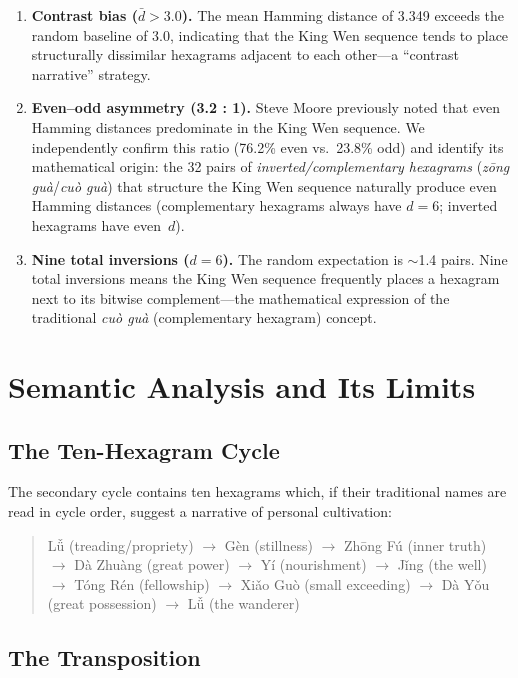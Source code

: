 \documentclass[11pt,a4paper]{article}
\begin{document}
\begin{enumerate}
  \item \textbf{Contrast bias ($\bar{d} > 3.0$).}
  The mean Hamming distance of 3.349 exceeds the random baseline of 3.0, indicating that the King Wen sequence tends to place structurally dissimilar hexagrams adjacent to each other---a ``contrast narrative'' strategy.

  \item \textbf{Even--odd asymmetry (3.2 : 1).}
  Steve Moore previously noted that even Hamming distances predominate in the King Wen sequence.
  We independently confirm this ratio (76.2\% even vs.\ 23.8\% odd) and identify its mathematical origin: the 32 pairs of \emph{inverted/complementary hexagrams} (\textit{zōng guà}/\textit{cuò guà}) that structure the King Wen sequence naturally produce even Hamming distances (complementary hexagrams always have $d=6$; inverted hexagrams have even~$d$).

  \item \textbf{Nine total inversions ($d=6$).}
  The random expectation is $\sim$1.4 pairs. Nine total inversions means the King Wen sequence frequently places a hexagram next to its bitwise complement---the mathematical expression of the traditional \emph{cuò guà} (complementary hexagram) concept.
\end{enumerate}


\section{Semantic Analysis and Its Limits}\label{sec:semantic}

\subsection{The Ten-Hexagram Cycle}

The secondary cycle contains ten hexagrams which, if their traditional names are read in cycle order, suggest a narrative of personal cultivation:

\begin{quote}\small
Lǚ (treading/propriety) $\to$ Gèn (stillness) $\to$ Zhōng Fú (inner truth) $\to$ Dà Zhuàng (great power) $\to$ Yí (nourishment) $\to$ Jǐng (the well) $\to$ Tóng Rén (fellowship) $\to$ Xiǎo Guò (small exceeding) $\to$ Dà Yǒu (great possession) $\to$ Lǚ (the wanderer)
\end{quote}

\subsection{The Transposition}
\end{document}
